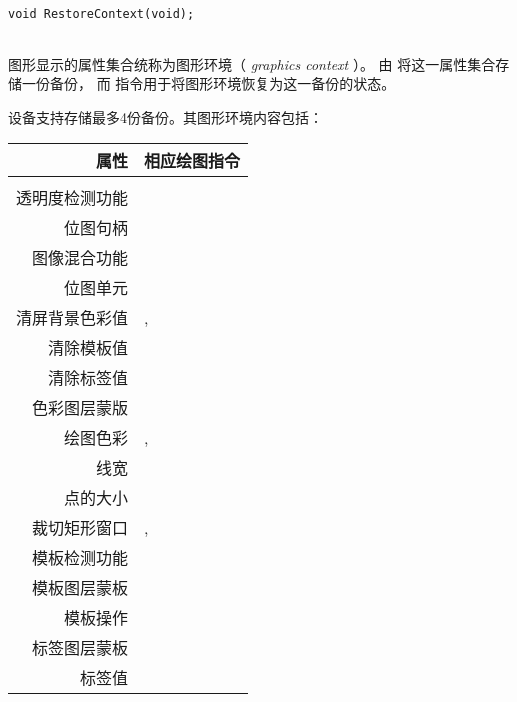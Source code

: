 
\begin{framed}
\begin{verbatim}
void RestoreContext(void);
\end{verbatim}
\end{framed}

\begin{tabular}{lp{}}

\end{tabular}

\vspace{10pt}
图形显示的属性集合统称为图形环境（ \textit{graphics context} ）。
由  将这一属性集合存储一份备份， 而  指令用于将图形环境恢复为这一备份的状态。

设备支持存储最多4份备份。其图形环境内容包括：
\vspace{10pt}

\begin{tabular}{rl}
属性 & 相应绘图指令 \\
\hline
\\
透明度检测功能   &  \nameref{AlphaFunc} \\
位图句柄         &  \nameref{BitmapHandle} \\
图像混合功能        &  \nameref{BlendFunc} \\
位图单元           &  \nameref{Cell} \\
清屏背景色彩值     & \nameref{ClearColorA}, \nameref{ClearColorRGB} \\
清除模板值   & \nameref{ClearStencil} \\
清除标签值       & \nameref{ClearTag} \\
色彩图层蒙版      & \nameref{ColorMask} \\
绘图色彩                 & \nameref{ColorA}, \nameref{ColorRGB} \\
线宽            & \nameref{LineWidth} \\
点的大小            & \nameref{PointSize} \\
裁切矩形窗口     & \nameref{ScissorSize}, \nameref{ScissorXY} \\
模板检测功能 & \nameref{StencilFunc} \\
模板图层蒙板    & \nameref{StencilMask} \\
模板操作     & \nameref{StencilOp} \\
标签图层蒙板        & \nameref{TagMask} \\
标签值             & \nameref{Tag}
\end{tabular}



